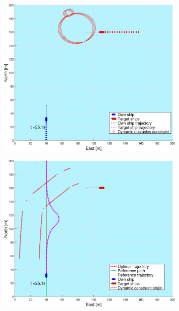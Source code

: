 \clearpage
\begin{figure}[ht!] %
    \begin{subfigure}[b]{0.494\textwidth}
        \centering
        \includegraphics[width=\textwidth]{Images/Figures/sving_HO/_Simple_0fig1_time=25}
        \subcaption{}
    \end{subfigure}
    \hfill
    \begin{subfigure}[b]{0.494\textwidth}
        \centering
        \includegraphics[width=\textwidth]{Images/Figures/sving_HO/_Simple_0fig999_time=25}

\end{subfigure}
\end{figure}
